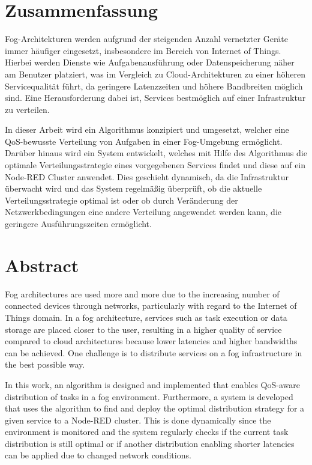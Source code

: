 \newpage

\section*{Zusammenfassung}

Fog-Architekturen werden aufgrund der steigenden Anzahl vernetzter Geräte immer häufiger eingesetzt, insbesondere im Bereich von Internet of Things.
Hierbei werden Dienste wie Aufgabenausführung oder Datenspeicherung näher am Benutzer platziert, was im Vergleich zu Cloud-Architekturen zu einer höheren Servicequalität führt, da geringere Latenzzeiten und höhere Bandbreiten möglich sind.
Eine Herausforderung dabei ist, Services bestmöglich auf einer Infrastruktur zu verteilen.

In dieser Arbeit wird ein Algorithmus konzipiert und umgesetzt, welcher eine QoS-bewusste Verteilung von Aufgaben in einer Fog-Umgebung ermöglicht.
Darüber hinaus wird ein System entwickelt, welches mit Hilfe des Algorithmus die optimale Verteilungsstrategie eines vorgegebenen Services findet und diese auf ein Node-RED Cluster anwendet.
Dies geschieht dynamisch, da die Infrastruktur überwacht wird und das System regelmäßig überprüft, ob die aktuelle Verteilungsstrategie optimal ist oder ob durch Veränderung der Netzwerkbedingungen eine andere Verteilung angewendet werden kann, die geringere Ausführungszeiten ermöglicht.


\section*{Abstract}

Fog architectures are used more and more due to the increasing number of connected devices through networks, particularly with regard to the Internet of Things domain.
In a fog architecture, services such as task execution or data storage are placed closer to the user, resulting in a higher quality of service compared to cloud architectures because lower latencies and higher bandwidths can be achieved.
One challenge is to distribute services on a fog infrastructure in the best possible way.

In this work, an algorithm is designed and implemented that enables QoS-aware distribution of tasks in a fog environment.
Furthermore, a system is developed that uses the algorithm to find and deploy the optimal distribution strategy for a given service to a Node-RED cluster.
This is done dynamically since the environment is monitored and the system regularly checks if the current task distribution is still optimal or if another distribution enabling shorter latencies can be applied due to changed network conditions.
